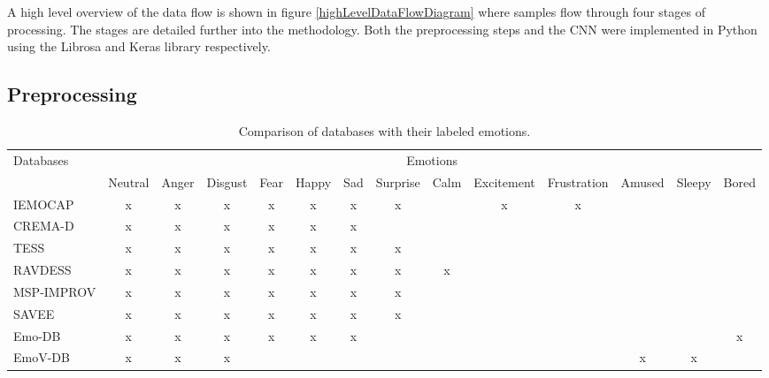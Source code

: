 A high level overview of the data flow is shown in figure \ref{highLevelDataFlowDiagram} where samples flow through four stages of processing. The stages are detailed further into the methodology. Both the preprocessing steps and the CNN were implemented in Python using the Librosa \cite{McFee2015} and Keras \cite{Chollet2015} library respectively.

\subsection{Preprocessing}

\begin{table*}
	\centering
	\caption{Comparison of databases with their labeled emotions.}
	\label{dbEmoTable}
	\begin{tabular}{@{}lccccccccccccc@{}}
		\toprule
		Databases & \multicolumn{13}{c}{Emotions} \\ 
		\cmidrule{2-14}
		& Neutral & Anger & Disgust & Fear & Happy & Sad & Surprise & Calm & Excitement & Frustration & Amused & Sleepy & Bored \\ 
		\midrule
		IEMOCAP & x & x & x & x & x & x & x &   & x & x &   &   &   \\
		CREMA-D & x & x & x & x & x & x &   &   &   &   &   &   &   \\
		TESS & x & x & x & x & x & x & x &   &   &   &   &   &   \\
		RAVDESS & x & x & x & x & x & x & x & x &   &   &   &   &   \\
		MSP-IMPROV & x & x & x & x & x & x & x &   &   &   &   &   &   \\
		SAVEE & x & x & x & x & x & x & x &   &   &   &   &   &   \\
		Emo-DB & x & x & x & x & x & x &   &   &   &   &   &   & x \\
		EmoV-DB & x & x & x &   &   &   &   &   &   &   & x & x &   \\
		\bottomrule
	\end{tabular}%
\end{table*}

